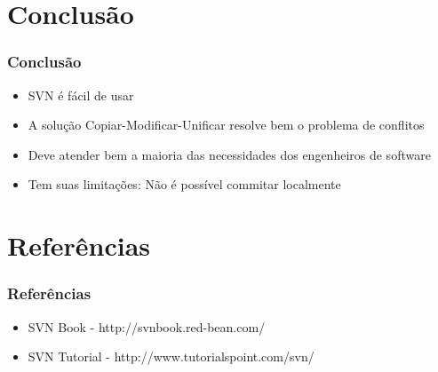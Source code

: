 \documentclass{beamer}
\begin{document}
\section{Conclus\~ao}

\begin{frame}
    \frametitle{Conclus\~ao}

    \begin{itemize}
        \item SVN \'e f\'acil de usar
        \item A solu\c{c}\~ao Copiar-Modificar-Unificar resolve bem o problema de conflitos
        \item Deve atender bem a maioria das necessidades dos engenheiros de software
        \item Tem suas limita\c{c}\~oes: N\~ao \'e poss\'ivel commitar localmente
    \end{itemize}
\end{frame}

\section{Refer\^encias}
\begin{frame}
    \frametitle{Refer\^encias}

    \begin{itemize}
        \item SVN Book - http://svnbook.red-bean.com/
        \item SVN Tutorial - http://www.tutorialspoint.com/svn/
    \end{itemize}
\end{frame}
\end{document}
